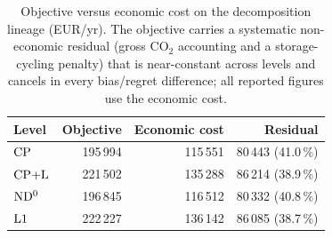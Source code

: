 \begin{table}[t]
\centering
\caption{Objective versus economic cost on the decomposition lineage (EUR/yr). The objective
carries a systematic non-economic residual (gross CO$_2$ accounting and a storage-cycling
penalty) that is near-constant across levels and cancels in every bias/regret difference; all
reported figures use the economic cost.}
\label{tab:objdecomp}
\begin{tabular}{lrrr}
\hline
Level & Objective & Economic cost & Residual \\
\hline
$\mathrm{CP}$   & 195\,994 & 115\,551 & 80\,443 (41.0\,\%) \\
$\mathrm{CP{+}L}$  & 221\,502 & 135\,288 & 86\,214 (38.9\,\%) \\
$\mathrm{ND^{0}}$  & 196\,845 & 116\,512 & 80\,332 (40.8\,\%) \\
$\mathrm{L1}$ & 222\,227 & 136\,142 & 86\,085 (38.7\,\%) \\
\hline
\end{tabular}
\end{table}
